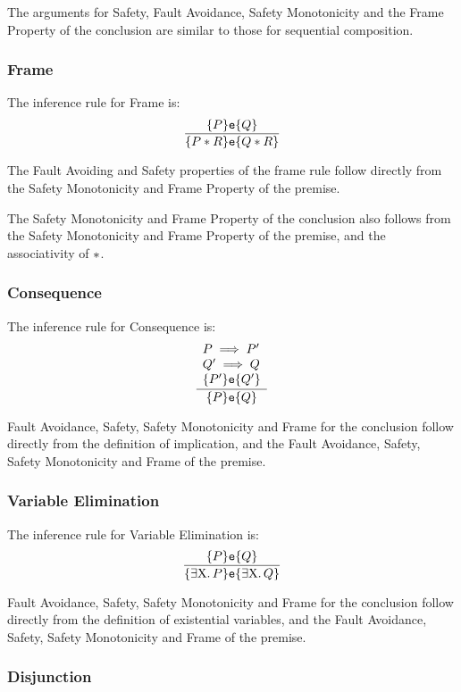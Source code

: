 \documentclass{article}
\begin{document}
The arguments for Safety, Fault Avoidance, Safety Monotonicity and the Frame Property of the conclusion are similar to those for sequential composition.

\subsubsection{Frame}

The inference rule for Frame is:
\[\frac{\{P\}\mbox{\texttt{{\upshape e}}}\{Q\}}
{\{P\mathbin{*} R\}\mbox{\texttt{{\upshape e}}}\{Q \mathbin{*} R\}}
\]

The Fault Avoiding and Safety properties of the frame rule follow directly from the Safety Monotonicity and Frame Property of the premise.

The Safety Monotonicity and Frame Property of the conclusion also follows from the Safety Monotonicity and Frame Property of the premise, and the associativity of $\mathbin{*}$.


\subsubsection{Consequence}

The inference rule for Consequence is:
\[\frac
{\begin{array}{l}P\implies P'\\ 
 Q' \implies Q\\
 \{P'\}\mbox{\texttt{{\upshape e}}}\{Q'\}\end{array}}
{\{P\}\mbox{\texttt{{\upshape e}}}\{Q\}}
\]

Fault Avoidance, Safety, Safety Monotonicity and Frame for the conclusion follow directly from the definition of implication, and the Fault Avoidance, Safety, Safety Monotonicity and Frame of the premise.



\subsubsection{Variable Elimination}

The inference rule for Variable Elimination is:
\[\frac{\{P\}\mbox{\texttt{{\upshape e}}}\{Q\}}
{\{\exists{{{\ensuremath{\mathrm{X}}}}}\mathpunct{.} P\}\mbox{\texttt{{\upshape e}}}\{\exists{{{\ensuremath{\mathrm{X}}}}}\mathpunct{.} Q\}}\]

Fault Avoidance, Safety, Safety Monotonicity and Frame for the conclusion follow directly from the definition of existential variables, and the Fault Avoidance, Safety, Safety Monotonicity and Frame of the premise.

\subsubsection{Disjunction}
\end{document}
